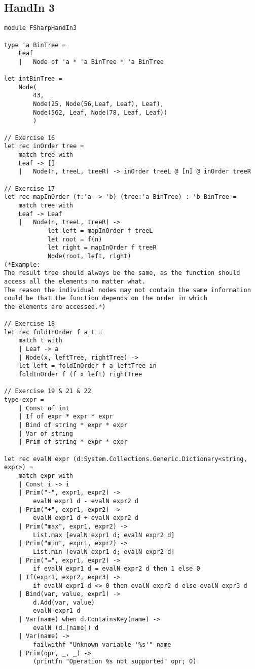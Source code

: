 \subsection{HandIn 3}
\label{Appendix_FSharp_Melnyk_3}
\begin{lstlisting}
module FSharpHandIn3

type 'a BinTree =
    Leaf
    |   Node of 'a * 'a BinTree * 'a BinTree

let intBinTree = 
    Node(
        43, 
        Node(25, Node(56,Leaf, Leaf), Leaf), 
        Node(562, Leaf, Node(78, Leaf, Leaf))
        )

// Exercise 16
let rec inOrder tree = 
    match tree with
    Leaf -> []
    |   Node(n, treeL, treeR) -> inOrder treeL @ [n] @ inOrder treeR

// Exercise 17
let rec mapInOrder (f:'a -> 'b) (tree:'a BinTree) : 'b BinTree = 
    match tree with
    Leaf -> Leaf
    |   Node(n, treeL, treeR) -> 
            let left = mapInOrder f treeL
            let root = f(n)
            let right = mapInOrder f treeR
            Node(root, left, right)
(*Example: 
The result tree should always be the same, as the function should 
access all the elements no matter what. 
The reason the individual nodes may not contain the same information 
could be that the function depends on the order in which 
the elements are accessed.*)

// Exercise 18
let rec foldInOrder f a t = 
    match t with
    | Leaf -> a
    | Node(x, leftTree, rightTree) ->
    let left = foldInOrder f a leftTree in
    foldInOrder f (f x left) rightTree

// Exercise 19 & 21 & 22
type expr =
    | Const of int
    | If of expr * expr * expr
    | Bind of string * expr * expr
    | Var of string
    | Prim of string * expr * expr

let rec evalN expr (d:System.Collections.Generic.Dictionary<string, expr>) =
    match expr with
    | Const i -> i
    | Prim("-", expr1, expr2) -> 
        evalN expr1 d - evalN expr2 d
    | Prim("+", expr1, expr2) -> 
        evalN expr1 d + evalN expr2 d
    | Prim("max", expr1, expr2) -> 
        List.max [evalN expr1 d; evalN expr2 d]
    | Prim("min", expr1, expr2) -> 
        List.min [evalN expr1 d; evalN expr2 d]
    | Prim("=", expr1, expr2) -> 
        if evalN expr1 d = evalN expr2 d then 1 else 0
    | If(expr1, expr2, expr3) -> 
        if evalN expr1 d <> 0 then evalN expr2 d else evalN expr3 d
    | Bind(var, value, expr1) -> 
        d.Add(var, value) 
        evalN expr1 d
    | Var(name) when d.ContainsKey(name) -> 
        evalN (d.[name]) d
    | Var(name) -> 
        failwithf "Unknown variable '%s'" name
    | Prim(opr, _, _) -> 
        (printfn "Operation %s not supported" opr; 0)


\end{lstlisting}
